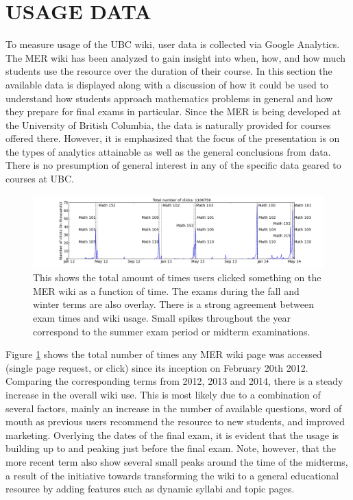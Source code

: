 \documentclass{primus}
\begin{document}
\section{USAGE DATA}\label{sec:Usage_Data}
To measure usage of the UBC wiki, user data is collected via Google Analytics. The MER wiki has been analyzed to gain insight into when, how, and how much students use the resource over the duration of their course. In this section the available data is displayed along with a discussion of how it could be used to understand how students approach mathematics problems in general and how they prepare for final exams in particular. Since the MER is being developed at the University of British Columbia, the data is naturally provided for courses offered there. However, it is emphasized that the focus of the presentation is on the types of analytics attainable as well as the general conclusions from data. There is no presumption of general interest in any of the specific data geared to courses at UBC.

\begin{figure}[H]
\centering
\includegraphics[width=\textwidth]{figs/total_number_of_clicks_time_series.png}
\caption{This shows the total amount of times users clicked something on the MER wiki as a function of time. The exams during the fall and winter terms are also overlay. There is a strong agreement between exam times and wiki usage. Small spikes throughout the year correspond to the summer exam period or midterm examinations.}\label{fig:total_number_of_clicks_time_series}
\end{figure}

\noindent{}Figure \ref{fig:total_number_of_clicks_time_series} shows the total number of times any MER wiki page was accessed (single page request, or click) since its inception on February 20th 2012. Comparing the corresponding terms from 2012, 2013 and 2014, there is a steady increase in the overall wiki use. This is most likely due to a combination of several factors, mainly an increase in the number of available questions, word of mouth as previous users recommend the resource to new students, and improved marketing. Overlying the dates of the final exam, it is evident that the usage is building up to and peaking just before the final exam. Note, however, that the more recent term also show several small peaks around the time of the midterms, a result of the initiative towards transforming the wiki to a general educational resource by adding features such as dynamic syllabi and topic pages.
\end{document}
